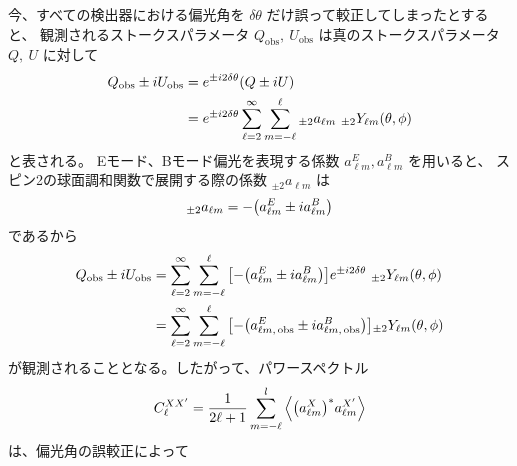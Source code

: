 \documentclass[../../main.tex]{subfiles}
\begin{document}
今、すべての検出器における偏光角を $\delta \theta$ だけ誤って較正してしまったとすると、
観測されるストークスパラメータ $Q_{\mathrm{obs}},\ U_{\mathrm{obs}}$ は真のストークスパラメータ $Q,\ U$ に対して
\begin{align}
    Q_{\mathrm{obs}} \pm iU_{\mathrm{obs}} &= e^{\pm i2\delta\theta}\qty(Q \pm iU) \\
    &= e^{\pm i2\delta\theta}\sum_{\ell=2}^{\infty}\sum_{m=-\ell}^{\ell} {}_{\pm 2}a_{\ell m}\ {}_{\pm 2}Y_{\ell m}(\theta, \phi)
\end{align}
と表される。\cite{so:Keating_2013}\cite{so:Kaufman_2014}
Eモード、Bモード偏光を表現する係数 $a_{\ell m}^{E}, a_{\ell m}^{B}$ を用いると、
スピン2の球面調和関数で展開する際の係数 ${}_{\pm 2}a_{\ell m}$ は
\begin{equation}
    {}_{\pm 2}a_{\ell m} = -\qty(a_{\ell m}^{E} \pm i a_{\ell m}^{B})
\end{equation}
であるから
\begin{align}
    Q_{\mathrm{obs}} \pm iU_{\mathrm{obs}} &= \sum_{\ell=2}^{\infty}\sum_{m=-\ell}^{\ell} \qty[-\qty(a_{\ell m}^{E} \pm i a_{\ell m}^{B})]e^{\pm i2\delta\theta}\ {}_{\pm 2}Y_{\ell m}(\theta, \phi) \\
    &= \sum_{\ell=2}^{\infty}\sum_{m=-\ell}^{\ell} \qty[-\qty(a_{\ell m,\,\mathrm{obs}}^{E} \pm i a_{\ell m,\,\mathrm{obs}}^{B})] {}_{\pm2}Y_{\ell m}(\theta, \phi)
\end{align}
が観測されることとなる。したがって、パワースペクトル
\begin{equation}
    C_{\ell}^{XX'} = \dfrac{1}{2\ell+1}\sum_{m=-\ell}^{l}\left\langle \qty(a_{\ell m}^{X})^{*} a_{\ell m}^{X'} \right\rangle
\end{equation}
は、偏光角の誤較正によって
\end{document}
